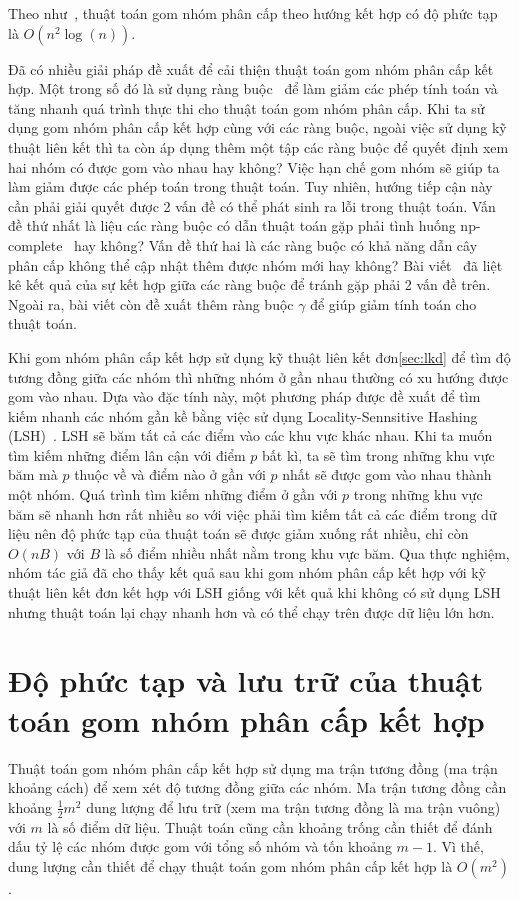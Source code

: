 Theo như~\cite{wiki-HAC}, thuật toán gom nhóm phân cấp theo hướng kết hợp có độ phức tạp là $O(n^2\log(n))$.

Đã có nhiều giải pháp đề xuất để cải thiện thuật toán gom nhóm phân cấp kết hợp.
Một trong số đó là sử dụng ràng buộc~\cite{hac-constraints} để làm giảm các phép tính toán và tăng nhanh quá trình thực thi cho thuật toán gom nhóm phân cấp.
Khi ta sử dụng gom nhóm phân cấp kết hợp cùng với các ràng buộc, ngoài việc sử dụng kỹ thuật liên kết thì ta còn áp dụng thêm một tập các ràng buộc để quyết định xem hai nhóm có được gom vào nhau hay không?
Việc hạn chế gom nhóm sẽ giúp ta làm giảm được các phép toán trong thuật toán.
Tuy nhiên, hướng tiếp cận này cần phải giải quyết được 2 vấn đề có thể phát sinh ra lỗi trong thuật toán.
Vấn đề thứ nhất là liệu các ràng buộc có dẫn thuật toán gặp phải tình huống np-complete~\cite{np-complete} hay không?
Vấn đề thứ hai là các ràng buộc có khả năng dẫn cây phân cấp không thể cập nhật thêm được nhóm mới hay không?
Bài viết~\cite{hac-constraints} đã liệt kê kết quả của sự kết hợp giữa các ràng buộc để tránh gặp phải 2 vấn đề trên.
Ngoài ra, bài viết còn đề xuất thêm ràng buộc $\gamma$ để giúp giảm tính toán cho thuật toán.

Khi gom nhóm phân cấp kết hợp sử dụng kỹ thuật liên kết đơn\ref{sec:lkd} để tìm độ tương đồng giữa các nhóm thì những nhóm ở gần nhau thường có xu hướng được gom vào nhau.
Dựa vào đặc tính này, một phương pháp được đề xuất để tìm kiếm nhanh các nhóm gần kề bằng việc sử dụng Locality-Sennsitive Hashing (LSH)~\cite{single-link-hash}.
LSH sẽ băm tất cả các điểm vào các khu vực khác nhau.
Khi ta muốn tìm kiếm những điểm lân cận với điểm $p$ bất kì, ta sẽ tìm trong những khu vực băm mà $p$ thuộc về và điểm nào ở gần với $p$ nhất sẽ được gom vào nhau thành một nhóm.
Quá trình tìm kiếm những điểm ở gần với $p$ trong những khu vực băm sẽ nhanh hơn rất nhiều so với việc phải tìm kiếm tất cả các điểm trong dữ liệu nên độ phức tạp của thuật toán sẽ được giảm xuống rất nhiều, chỉ còn $O(nB)$ với $B$ là số điểm nhiều nhất nằm trong khu vực băm.
Qua thực nghiệm, nhóm tác giả đã cho thấy kết quả sau khi gom nhóm phân cấp kết hợp với kỹ thuật liên kết đơn kết hợp với LSH giống với kết quả khi không có sử dụng LSH nhưng thuật toán lại chạy nhanh hơn và có thể chạy trên được dữ liệu lớn hơn.

\section{Độ phức tạp và lưu trữ của thuật toán gom nhóm phân cấp kết hợp}
\label{sec:dpt}
Thuật toán gom nhóm phân cấp kết hợp sử dụng ma trận tương đồng (ma trận khoảng cách) để xem xét độ tương đồng giữa các nhóm.
Ma trận tương đồng cần khoảng $\frac{1}{2} m^2$ dung lượng để lưu trữ (xem ma trận tương đồng là ma trận vuông) với $m$ là số điểm dữ liệu.
Thuật toán cũng cần khoảng trống cần thiết để đánh dấu tỷ lệ các nhóm được gom với tổng số nhóm và tốn khoảng $m - 1$.
Vì thế, dung lượng cần thiết để chạy thuật toán gom nhóm phân cấp kết hợp là $O(m^2)$.

